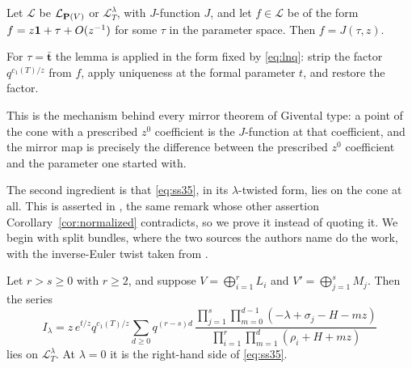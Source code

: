 \begin{lemma}
  \label{lem:jslice}
  Let \(\mathcal L\) be \(\mathcal L_{\mathbf P(V)}\) or
  \(\mathcal L_{T}^{\lambda}\), with \(J\)-function \(J\), and let
  \(f\in\mathcal L\) be of the form \(f=z\mathbf 1+\tau+O(z^{-1})\) for
  some \(\tau\) in the parameter space.  Then \(f=J(\tau,z)\).
\end{lemma}

For \(\tau=\bar{\mathbf t}\) the lemma is applied in the form fixed by
\eqref{eq:lnq}: strip the factor \(q^{c_{1}(T)/z}\) from \(f\), apply
uniqueness at the formal parameter \(t\), and restore the factor.

This is the mechanism behind every mirror theorem of Givental type: a point
of the cone with a prescribed \(z^{0}\) coefficient is the \(J\)-function at
that coefficient, and the mirror map is precisely the difference between
the prescribed \(z^{0}\) coefficient and the parameter one started with.

The second ingredient is that \eqref{eq:ss35}, in its \(\lambda\)-twisted
form, lies on the cone at all.  This is asserted in
\cite[Remark~4.5(3)]{SS}, the same remark whose other assertion
Corollary~\ref{cor:normalized} contradicts, so we prove it instead of quoting
it.  We begin with split bundles, where the two sources the authors name do
the work, with the inverse-Euler twist taken from \cite{CCIT}.

\begin{lemma}
  \label{lem:cone}
  Let \(r>s\ge0\) with \(r\ge2\), and suppose \(V=\bigoplus_{i=1}^{r}L_{i}\)
  and \(V'=\bigoplus_{j=1}^{s}M_{j}\).  Then the series
  \begin{equation}
    \label{eq:Ilambda}
    I_{\lambda}
    =z\,e^{t/z}q^{c_{1}(T)/z}
    \sum_{d\ge0}q^{(r-s)d}\,
    \frac{\prod_{j=1}^{s}\prod_{m=0}^{d-1}(-\lambda+\sigma_{j}-H-mz)}
         {\prod_{i=1}^{r}\prod_{m=1}^{d}(\rho_{i}+H+mz)}
  \end{equation}
  lies on \(\mathcal L_{T}^{\lambda}\).  At \(\lambda=0\) it is the
  right-hand side of \eqref{eq:ss35}.
\end{lemma}

